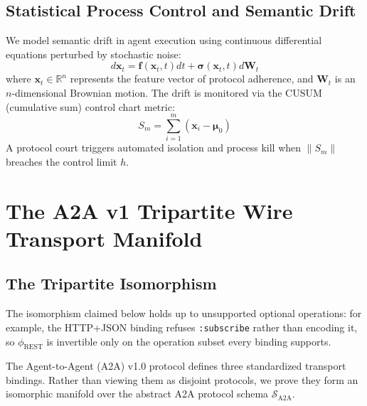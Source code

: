 \documentclass[11pt,twoside,openright]{report}
\theoremstyle{definition}
\theoremstyle{plain}
\theoremstyle{remark}
\newcommand{\Rspace}{\mathbb{R}}
\begin{document}
\section{Statistical Process Control and Semantic Drift}
We model semantic drift in agent execution using continuous differential equations perturbed by stochastic noise:
\[
d\mathbf{x}_t = \mathbf{f}(\mathbf{x}_t, t)dt + \boldsymbol{\sigma}(\mathbf{x}_t, t) d\mathbf{W}_t
\]
where $\mathbf{x}_t \in \Rspace^n$ represents the feature vector of protocol adherence, and $\mathbf{W}_t$ is an $n$-dimensional Brownian motion. The drift is monitored via the CUSUM (cumulative sum) control chart metric:
\[
S_m = \sum_{i=1}^m (\mathbf{x}_i - \boldsymbol{\mu}_0)
\]
A protocol court triggers automated isolation and process kill when $\|S_m\|$ breaches the control limit $h$.

\chapter{The A2A v1 Tripartite Wire Transport Manifold}
\label{ch:transport}

\section{The Tripartite Isomorphism}
The isomorphism claimed below holds up to unsupported optional operations: for example, the HTTP+JSON binding refuses \texttt{:subscribe} rather than encoding it, so $\phi_{\mathrm{REST}}$ is invertible only on the operation subset every binding supports.

The Agent-to-Agent (A2A) v1.0 protocol defines three standardized transport bindings. Rather than viewing them as disjoint protocols, we prove they form an isomorphic manifold over the abstract A2A protocol schema $\mathcal{S}_{\mathrm{A2A}}$.
\end{document}
